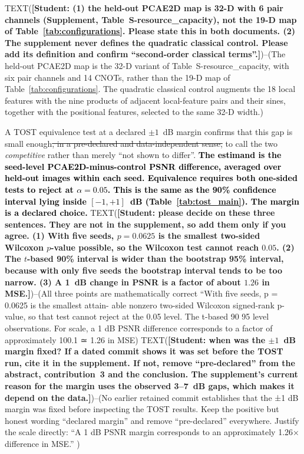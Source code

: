 \documentclass[pdflatex,sn-basic]{sn-jnl}
\newcommand{\del}[1]{\sout{#1}}
\newcommand{\add}[1]{\textbf{\textcolor{black}{#1}}}
\begin{document}
TEXT({\color{red}\textbf{[Student: (1) the held-out PCAE2D map is 32-D with 6 pair
channels (Supplement, Table~S-resource\_capacity), not the 19-D map of
Table~\ref{tab:configurations}. Please state this in both documents. (2) The
supplement never defines the quadratic classical control. Please add its
definition and confirm ``second-order classical terms''.]}})--(The held-out PCAE2D map is the 32-D variant of Table~S-resource\_capacity,
with six pair channels and 14 CNOTs, rather than the 19-D map of
Table~\ref{tab:configurations}. The quadratic classical control augments the
18 local features with the nine products of adjacent local-feature pairs and
their sines, together with the positional features, selected to the same
32-D width.)

A TOST equivalence test \add{\citep{Schuirmann1987, Lakens2017}} at a declared $\pm1$~dB margin confirms that this gap is
small enough\del{, in a pre-declared and data-independent sense,} to call the two
\emph{competitive} rather than merely ``not shown to differ''.
\add{The estimand is the seed-level PCAE2D-minus-control PSNR difference,
averaged over held-out images within each seed. Equivalence requires both
one-sided tests to reject at $\alpha=0.05$. This is the same as the 90\%
confidence interval lying inside $[-1,+1]$~dB (Table~\ref{tab:tost_main}). The
margin is a declared choice.}
TEXT({\color{red}\textbf{[Student: please decide on these three sentences. They are
not in the supplement, so add them only if you agree. (1) With five seeds,
$p=0.0625$ is the smallest two-sided Wilcoxon $p$-value possible, so the
Wilcoxon test cannot reach $0.05$. (2) The $t$-based 90\% interval is wider than
the bootstrap 95\% interval, because with only five seeds the bootstrap interval
tends to be too narrow. (3) A 1~dB change in PSNR is a factor of about $1.26$ in
MSE.]}})--(All three points are mathematically correct “With five seeds, p = 0.0625 is the smallest attain-
able nonzero two-sided Wilcoxon signed-rank p-value, so that test cannot reject
at the 0.05 level. The t-based 90%
95%
level observations. For scale, a 1 dB PSNR difference corresponds to a factor of
approximately 100.1 ≃ 1.26 in MSE)
TEXT({\color{red}\textbf{[Student: when was the $\pm1$~dB margin fixed? If a dated
commit shows it was set before the TOST run, cite it in the supplement. If not,
remove ``pre-declared'' from the abstract, contribution~3 and the conclusion.
The supplement's current reason for the margin uses the observed 3--7~dB gaps,
which makes it depend on the data.]}})--(No earlier retained commit establishes that the ±1 dB margin was fixed
before inspecting the TOST results. Keep the positive but honest wording “declared
margin” and remove “pre-declared” everywhere. Justify the scale directly: “A 1 dB
PSNR margin corresponds to an approximately 1.26× difference in MSE.” )
\end{document}
